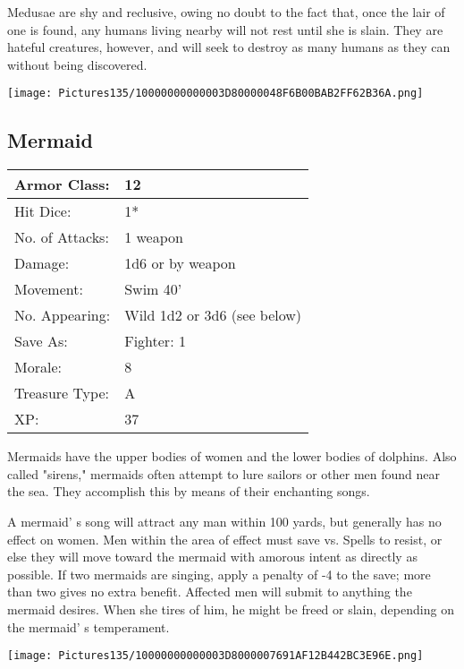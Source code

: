 \documentclass[a4paper,twoside,openany,10pt]{book}
\begin{document}
\begin{multicols}{2}
Medusae are shy and reclusive, owing no doubt to the fact that, once the lair of one is found, any humans living nearby will not rest until she is slain. They are hateful creatures, however, and will seek to destroy as many humans as they can without being discovered.

\begin{center} \texttt{[image: Pictures135/10000000000003D80000048F6B00BAB2FF62B36A.png]} \end{center}


\subsection*{Mermaid}\label{mermaid}

\begin{tabularx}{0.50\textwidth}{@{}lX@{}}
Armor Class: & 12 \\\hline
Hit Dice: & 1* \\\hline
No. of Attacks: & 1 weapon \\\hline
Damage: & 1d6 or by weapon \\\hline
Movement: & Swim 40' \\\hline
No. Appearing: & Wild 1d2 or 3d6 (see below) \\\hline
Save As: & Fighter: 1 \\\hline
Morale: & 8 \\\hline
Treasure Type: & A \\\hline
XP: & 37 \\\hline
\end{tabularx}\medskip

Mermaids have the upper bodies of women and the lower bodies of dolphins. Also called "sirens," mermaids often attempt to lure sailors or other men found near the sea. They accomplish this by means of their enchanting songs.

A mermaid' s song will attract any man within 100 yards, but generally has no effect on women. Men within the area of effect must save vs. Spells to resist, or else they will move toward the mermaid with amorous intent as directly as possible. If two mermaids are singing, apply a penalty of -4 to the save; more than two gives no extra benefit. Affected men will submit to anything the mermaid desires. When she tires of him, he might be freed or slain, depending on the mermaid' s temperament.


\begin{center} \texttt{[image: Pictures135/10000000000003D8000007691AF12B442BC3E96E.png]} \end{center}


\end{multicols}
\end{document}
